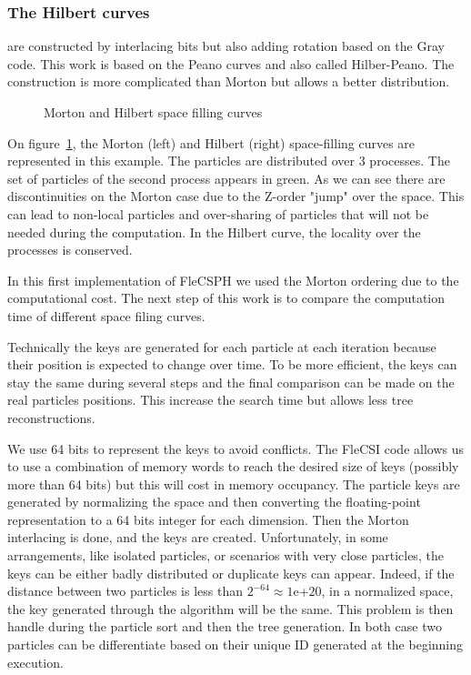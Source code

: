 \subsubsection*{The Hilbert curves} \cite{sagan2012space} are constructed by interlacing bits but also adding rotation based on the Gray code.
This work is based on the Peano curves and also called Hilber-Peano. 
The construction is more complicated than Morton but allows a better distribution. 

\begin{figure}[t!]
\centering

\caption{Morton and Hilbert space filling curves}
\label{fig:space_filling}
\end{figure}

On figure~\ref{fig:space_filling}, the Morton (left) and Hilbert (right) space-filling curves are represented in this example.
The particles are distributed over 3 processes. 
The set of particles of the second process appears in green. 
As we can see there are discontinuities on the Morton case due to the Z-order "jump" over the space. 
This can lead to non-local particles and over-sharing of particles that will not be needed during the computation.
In the Hilbert curve, the locality over the processes is conserved.

In this first implementation of FleCSPH we used the Morton ordering due to the computational cost. 
The next step of this work is to compare the computation time of different space filing curves. 

Technically the keys are generated for each particle at each iteration because their position is expected to change over time. 
To be more efficient, the keys can stay the same during several steps and the final comparison can be made on the real particles positions. 
This increase the search time but allows less tree reconstructions.

We use 64 bits to represent the keys to avoid conflicts.
The FleCSI code allows us to use a combination of memory words to reach the desired size of keys (possibly more than 64 bits) but this will cost in memory occupancy. 
The particle keys are generated by normalizing the space and then converting the floating-point representation to a 64 bits integer for each dimension. 
Then the Morton interlacing is done, and the keys are created. 
Unfortunately, in some arrangements, like isolated particles, or scenarios with very close particles, the keys can be either badly distributed or duplicate keys can appear. 
Indeed, if the distance between two particles is less than $2^{-64} \approx 1$e+$20$, in a normalized space, the key generated through the algorithm will be the same. 
This problem is then handle during the particle sort and then the tree generation. 
In both case two particles can be differentiate based on their unique ID generated at the beginning execution. 

